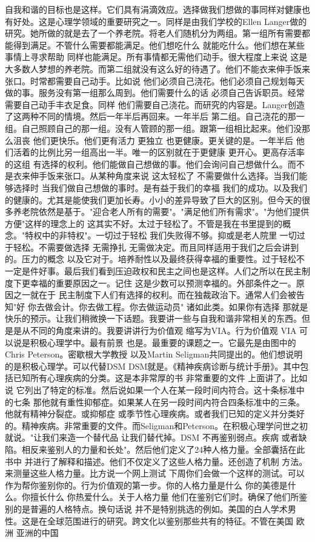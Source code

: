 自我和谐的目标也是这样。它们具有涓滴效应。选择做我们想做的事同样对健康也有好处。这是心理学领域的重要研究之一。同样是由我们学校的Ellen Langer做的研究。她所做的就是去了一个养老院。将老人们随机分为两组。第一组所有需要都能得到满足。不管什么需要都能满足。他们想吃什么 就能吃什么。他们想在某些事情上寻求帮助 同样也能满足。所有事情都无需他们动手。很大程度上来说 这是大多数人梦想的养老院。而第二组就没有这么好的待遇了。他们不能衣来伸手饭来张口。时常都需要自己动手。比如说 他们必须自己浇花。他们必须自己规划每天做的事。服务没有第一组那么周到。他们需要什么的话 必须自己告诉职员。经常需要自己动手丰衣足食。同样 他们需要自己浇花。而研究的内容是。Langer创造了这两种不同的情境。然后一年半后再回来。一年半后 第二组。自己浇花的那一组。自己照顾自己的那一组。没有人管顾的那一组。跟第一组相比起来。他们没那么沮丧 他们更快乐。他们更有活力 更独立 也更健康。更关键的是。一年半后 他们活着的比例比另一组高出一半。唯一的区别就在于更健康 更开心。更高存活率的这组 有选择的权利。他们能做自己想做的事。他们会询问自己想做什么。而不是衣来伸手饭来张口。从某种角度来说 这太轻松了 不需要做什么选择。当我们能够选择时 当我们做自己想做的事时。是有益于我们的幸福 我们的成功。以及我们的健康的。尤其是能使我们更加长寿。小小的差异导致了巨大的区别。但今天的很多养老院依然是基于。"迎合老人所有的需要"。"满足他们所有需求"。"为他们提供方便"这样的理念上的 这其实不好。太过于轻松了。不管是我在书里提到的概念。"特权中的非特权"。一切过于轻松 我们失败得不够。抑或是老人院里 一切过于轻松。不需要做选择 无需挣扎 无需做决定。而且同样适用于我们之后会讲到的。压力的概念 以及它对于。培养耐性以及最终获得幸福的重要性。过于轻松不一定是件好事。最后我们看到压迫政权和民主之间也是这样。人们之所以在民主制度下更幸福的重要原因之一。记住 这是少数可以预测幸福的。外部条件之一。原因之一就在于 民主制度下人们有选择的权利。而在独裁政治下。通常人们会被告知"好 你去做会计。你去做工程。你去做运动员" 诸如此类。如果你有选择 那就是快乐的预示。让我们稍微换一下话题。我要讲一些与自我和谐非常相关的东西。但是是从不同的角度来讲的。我要讲讲行为价值观 缩写为VIA。行为价值观 VIA 可以说是积极心理学中。最有前景 也是。最重要的课题之一。它最先是由图中的Chris Peterson。密歇根大学教授 以及Martin Seligman共同提出的。他们想说明的是积极心理学。可以代替DSM DSM就是。《精神疾病诊断与统计手册》。其中包括已知所有心理疾病的分类。这是本非常厚的书 非常重要的文件 上面讲了。比如说 它列出了特定的标准。然后说如果一个人在某一段时间内符合。这十条标准中的七条 那他就有重性抑郁症。如果某人在另一段时间内符合四条标准中的三条。他就有精神分裂症。或抑郁症 或季节性心理疾病。或者我们已知的定义并分类好的。精神疾病。非常重要的文件。而Seligman和Peterson。在积极心理学问世之初就说。"让我们来造一个替代品 让我们替代掉。DSM 不再鉴别弱点。疾病 或者缺陷。相反来鉴别人的力量和长处"。然后他们定义了24种人格力量。全部囊括在此书中 并进行了解释和描述。他们不仅定义了这些人格力量。还创造了机制 方法。来测量这些人格力量。比方说一个网上测试 下周你们会做一个这样的测试。可以作为帮你鉴别你的。行为价值观的第一步。你的人格力量是什么 你的美德是什么。你擅长什么 你热爱什么。关于人格力量 他们在鉴别它们时。确保了他们所鉴别的是普遍的人格特点。换句话说 并不是特别挑选的例如。美国的白人学术男性。这是在全球范围进行的研究。跨文化以鉴别那些共有的特征。不管在美国 欧洲 亚洲的中国 